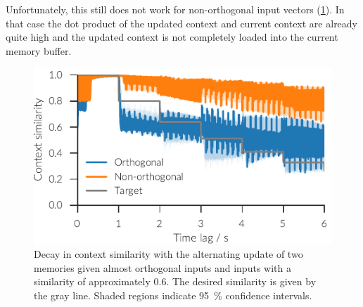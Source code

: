 Unfortunately, this still does not work for non-orthogonal input vectors (\cref{fig:amb}).
In that case the dot product of the updated context and current context are already quite high and the updated context is not completely loaded into the current memory buffer.
\begin{figure}
    \centering
    \includegraphics{figures/context-analysis/amb}
    \caption[Decay in context similarity with the alternating update of two memories]{
        Decay in context similarity with the alternating update of two memories given almost orthogonal inputs and inputs with a similarity of approximately \num{0.6}.
        The desired similarity is given by the gray line. Shaded regions indicate \SI{95}{\percent} confidence intervals.}\label{fig:amb}
\end{figure}


